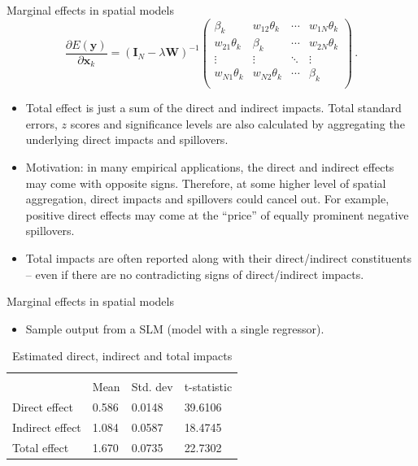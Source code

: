 \documentclass{beamer}
\begin{document}
\begin{frame}{Marginal effects in spatial models}
\vspace{-0.3cm}
\begin{equation*}
\frac{\partial E(\bm{y})}{\partial \bm{x}_k}
    =(\bm{I}_N - \lambda \bm{W})^{-1}
	\begin{pmatrix}
		\beta_{k} & w_{12}\theta_{k}& \cdots & w_{1N}\theta_{k}\\
		w_{21}\theta_{k}& \beta_{k} & \cdots & w_{2N}\theta_{k}\\
		\vdots & \vdots & \ddots & \vdots \\
		w_{N1}\theta_{k} & w_{N2}\theta_{k} & \cdots & \beta_{k} \\
	\end{pmatrix}\,. 
\end{equation*}
\begin{itemize}
    \item Total effect is just a sum of the direct and indirect impacts. Total standard errors, $z$ scores and significance levels are also calculated by aggregating the underlying direct impacts and spillovers. 
    \smallskip
    \item Motivation: in many empirical applications, the direct and indirect effects may come with opposite signs. Therefore, at some higher level of spatial aggregation, direct impacts and spillovers could cancel out. For example, positive direct effects may come at the ``price'' of equally prominent negative spillovers. 
    \smallskip
    \item Total impacts are often reported along with their direct/indirect constituents -- even if there are no contradicting signs of direct/indirect impacts. 
\end{itemize}	
\end{frame}
\begin{frame}{Marginal effects in spatial models}
\begin{itemize}
	\item Sample output from a SLM (model with a single regressor).
	
	\end{itemize}
\begin{table}[]
\centering
\caption{Estimated direct, indirect and total   impacts}
\begin{tabular}{llll}
&         &          &             \\
& Mean    & Std. dev & t-statistic \\
\hline
Direct effect                                                                                          & 0.586   & 0.0148   & 39.6106     \\
Indirect effect                                                                                        & 1.084 & 0.0587   & 18.4745     \\
Total effect                                                                                           & 1.670    & 0.0735   & 22.7302    
\end{tabular}
\end{table}
\end{frame}
\end{document}
